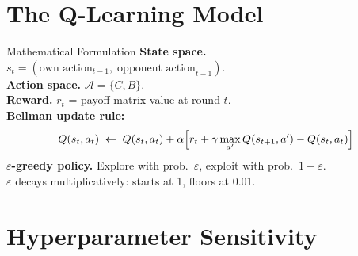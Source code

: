 \documentclass[10pt, aspectratio=169]{beamer}
\begin{document}
\section{The Q-Learning Model}

\begin{frame}{Mathematical Formulation}
  \textbf{State space.} \(s_t = (\text{own action}_{t-1},\; \text{opponent action}_{t-1})\).\\[0.4em]
  \textbf{Action space.} \(\mathcal{A} = \{C, B\}\).\\[0.4em]
  \textbf{Reward.} \(r_t\) = payoff matrix value at round \(t\).\\[0.8em]

  \textbf{Bellman update rule:}
  \[
    Q(s_t, a_t) \;\leftarrow\; Q(s_t, a_t) + \alpha\Bigl[r_t + \gamma \max_{a'} Q(s_{t+1}, a') - Q(s_t, a_t)\Bigr]
  \]
  \vspace{0.5em}
  \textbf{\(\varepsilon\)-greedy policy.} Explore with prob.\ \(\varepsilon\), exploit with prob.\ \(1-\varepsilon\).\\
  \(\varepsilon\) decays multiplicatively: starts at 1, floors at 0.01.\\[0.8em]


\end{frame}

\section{Hyperparameter Sensitivity}
\end{document}
